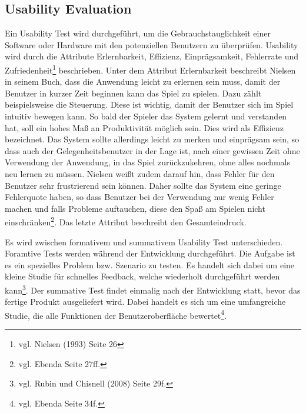 		\subsection{Usability Evaluation}
			Ein Usability Test wird durchgeführt, um die Gebrauchstauglichkeit einer Software oder Hardware mit den potenziellen Benutzern zu überprüfen. Usability wird durch die Attribute Erlernbarkeit, Effizienz, Einprägsamkeit, Fehlerrate und Zufriedenheit\footnote{vgl. Nielsen \cite{NielsenUI} (1993) Seite 26} beschrieben. Unter dem Attribut Erlernbarkeit beschreibt Nielsen in seinem Buch, dass die Anwendung leicht zu erlernen sein muss, damit der Benutzer in kurzer Zeit beginnen kann das Spiel zu spielen. Dazu zählt beispielsweise die Steuerung. Diese ist wichtig, damit der Benutzer sich im Spiel intuitiv bewegen kann. So bald der Spieler das System gelernt und verstanden hat, soll ein hohes Maß an Produktivität möglich sein. Dies wird als Effizienz bezeichnet. Das System sollte allerdings leicht zu merken und einprägsam sein, so dass auch der Gelegenheitsbenutzer in der Lage ist, nach einer gewissen Zeit ohne Verwendung der Anwendung, in das Spiel zurückzukehren, ohne alles nochmals neu lernen zu müssen. Nielsen weißt zudem darauf hin, dass Fehler für den Benutzer sehr frustrierend sein können. Daher sollte das System eine geringe Fehlerquote haben, so dass Benutzer bei der Verwendung nur wenig Fehler machen und falls Probleme auftauchen, diese den Spaß am Spielen nicht einschränken\footnote{vgl. Ebenda Seite 27ff.}. Das letzte Attribut beschreibt den Gesamteindruck.

			Es wird zwischen formativem und summativem Usability Test unterschieden. Foramtive Tests werden während der Entwicklung durchgeführt. Die Aufgabe ist es ein spezielles Problem bzw. Szenario zu testen. Es handelt sich dabei um eine kleine Studie für schnelles Feedback, welche wiederholt durchgeführt werden kann\footnote{vgl. Rubin und Chisnell \cite{handbookUsability} (2008) Seite 29f.}. Der summative Test findet einmalig nach der Entwicklung statt, bevor das fertige Produkt ausgeliefert wird. Dabei handelt es sich um eine umfangreiche Studie, die alle Funktionen der Benutzeroberfläche bewertet\footnote{vgl. Ebenda Seite 34f.}.

